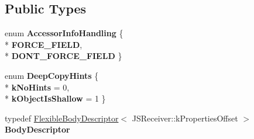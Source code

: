 \subsection*{Public Types}
\begin{DoxyCompactItemize}
\item 
enum {\bfseries Accessor\+Info\+Handling} \{ \\*
{\bfseries F\+O\+R\+C\+E\+\_\+\+F\+I\+E\+LD}, 
\\*
{\bfseries D\+O\+N\+T\+\_\+\+F\+O\+R\+C\+E\+\_\+\+F\+I\+E\+LD}
 \}\hypertarget{classv8_1_1internal_1_1_j_s_object_a7f0e7a7d79b2a2169ba93fa1da932a69}{}\label{classv8_1_1internal_1_1_j_s_object_a7f0e7a7d79b2a2169ba93fa1da932a69}

\item 
enum {\bfseries Deep\+Copy\+Hints} \{ \\*
{\bfseries k\+No\+Hints} = 0, 
\\*
{\bfseries k\+Object\+Is\+Shallow} = 1
 \}\hypertarget{classv8_1_1internal_1_1_j_s_object_a88ba397dab898281cbd363286a67f27f}{}\label{classv8_1_1internal_1_1_j_s_object_a88ba397dab898281cbd363286a67f27f}

\item 
typedef \hyperlink{classv8_1_1internal_1_1_flexible_body_descriptor}{Flexible\+Body\+Descriptor}$<$ J\+S\+Receiver\+::k\+Properties\+Offset $>$ {\bfseries Body\+Descriptor}\hypertarget{classv8_1_1internal_1_1_j_s_object_a52765f84bed8b67190097636e6edd845}{}\label{classv8_1_1internal_1_1_j_s_object_a52765f84bed8b67190097636e6edd845}

\end{DoxyCompactItemize}
